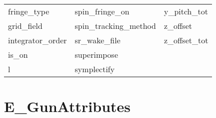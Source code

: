 \begin{tabular}{lll}
fringe_type                 & spin_fringe_on              & y_pitch_tot                 \\
grid_field                  & spin_tracking_method        & z_offset                    \\
integrator_order            & sr_wake_file                & z_offset_tot                \\
is_on                       & superimpose                 &                             \\
l                           & symplectify                 &                             \\
 \bottomrule
 \end{tabular}
 \vfill
 
 \section{E_GunAttributes}
 \label{s:list.e.gun}
 
